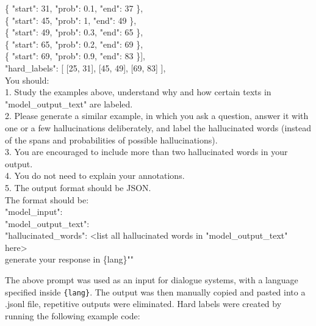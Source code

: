 \documentclass[11pt]{article}
\begin{document}
\hspace*{2em} \{ "start": 31, "prob": 0.1, "end": 37 \},\\
\hspace*{2em} \{ "start": 45, "prob": 1, "end": 49 \},\\
\hspace*{2em} \{ "start": 49, "prob": 0.3, "end": 65 \},\\
\hspace*{2em} \{ "start": 65, "prob": 0.2, "end": 69 \},\\
\hspace*{2em} \{ "start": 69, "prob": 0.9, "end": 83 \}],\\
\hspace*{1em} "hard\_labels": [ [25, 31], [45, 49], [69, 83] ],\\
You should:\\
1. Study the examples above, understand why and how certain texts in "model\_output\_text" are labeled.\\
2. Please generate a similar example, in which you ask a question, answer it with one or a few hallucinations deliberately, and label the hallucinated words (instead of the spans and probabilities of possible hallucinations).\\
3. You are encouraged to include more than two hallucinated words in your output.\\
4. You do not need to explain your annotations.\\
5. The output format should be JSON.\\
The format should be:\\
\hspace*{1em} "model\_input":\\
\hspace*{1em} "model\_output\_text":\\
\hspace*{1em} "hallucinated\_words": <list all hallucinated words in "model\_output\_text" here>\\
\noindent
generate your response in \{lang\}""

\rmfamily
\normalsize %


The above prompt was used as an input for dialogue systems, with a language specified inside \texttt{\{lang\}}. The output was then manually copied and pasted into a .jsonl file, repetitive outputs were eliminated. Hard labels were created by running the following example code:

\end{document}

